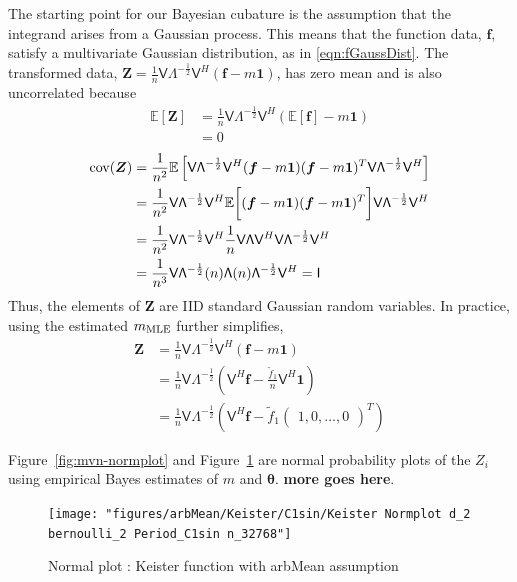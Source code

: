 \documentclass{iitthesis}          %
\newcommand{\bm}[1]{\boldsymbol{#1}}
\newcommand{\Ex}{\mathbb{E}}
\newcommand{\vtheta}{{\bm{\theta}}}
\newcommand{\vf}{\bm{f}}
\newcommand{\vZ}{\bm{Z}}
\newcommand{\vone}{\bm{1}}
\newcommand{\cov}{{\textup{cov}}}
\newcommand{\mLambda}{\mathsf{\Lambda}}
\newcommand{\mV}{\mathsf{V}}
\newcommand{\MLE}{\textup{MLE}}
\newcommand\figref{Figure~\ref}
\begin{document}
{{{{{{The starting point for our Bayesian cubature is the assumption that the integrand arises from a Gaussian process. This means that the function data, $\vf$, satisfy a multivariate Gaussian distribution, as in \eqref{eqn:fGaussDist}.  The transformed data, $\vZ = \frac 1n \mV \mLambda^{-\frac 12} \mV^H(\vf - m \vone)$, has zero mean and is also uncorrelated because
\begin{align*}
\Ex\left[\vZ \right] &= 
\frac 1n \mV \mLambda^{-\frac 12} \mV^H(\Ex\left[\vf\right] - m \vone) 
\\
& = 0
\end{align*}
\begin{align*}
\cov (\vZ) 
&= \frac {1}{n^2} \Ex\left[  
\mV \mLambda^{-\frac 12} \mV^H (\vf - m \vone)
(\vf - m \vone)^T \mV \mLambda^{-\frac 12} \mV^H
\right]
\\
&=
\frac {1}{n^2} \mV \mLambda^{-\frac 12} \mV^H 
\Ex \biggl[ (\vf - m \vone)
(\vf - m \vone)^T \biggr] \mV \mLambda^{-\frac 12} \mV^H
\\ %
&=
\frac{1}{n^2} \mV \mLambda^{-\frac 12} \mV^H 
\frac 1n \mV \mLambda \mV^H \mV \mLambda^{-\frac 12} \mV^H
\\
&=
\frac{1}{n^3} \mV \mLambda^{-\frac 12} (n) \mLambda (n) \mLambda^{-\frac 12} \mV^H
= \mathsf{I}
\end{align*}
Thus, the elements of $\vZ$ are IID standard Gaussian random variables.  
In practice, using the estimated $m_\MLE$ further simplifies, 
\begin{align*}
\vZ &= \frac 1n \mV \mLambda^{-\frac 12} \mV^H(\vf - m \vone) \\
 &= \frac 1n \mV \mLambda^{-\frac 12} (\mV^H \vf - \frac{\tilde{f}_1}{n} \mV^H \vone) 
\\
 &= \frac 1n \mV \mLambda^{-\frac 12} \left(\mV^H \vf - \tilde{f}_1 \begin{pmatrix}1, 0, \hdots, 0 \end{pmatrix}^T \right) 
\end{align*}

\figref{fig:mvn-normplot} and \figref{fig:keister-normplot} are normal probability plots of the $Z_i$ using empirical Bayes estimates of $m$ and $\vtheta$. \textbf{more goes here}.


\iffalse
\begin{figure}
	\centering
	\texttt{[image: "figures/arbMean/Keister/C1sin/Keister Normplot d\_2 bernoulli\_2 Period\_C1sin n\_32768"]}
	\caption{Normal plot : Keister function with arbMean assumption}
	\label{fig:keister-normplot}
\end{figure}




}}}}}}
\end{document}
